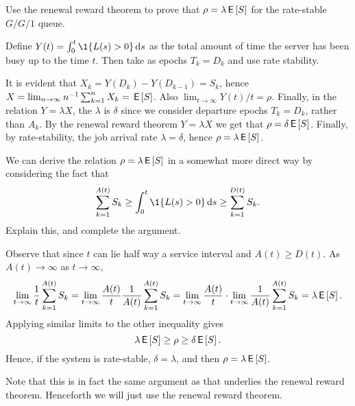 \begin{exercise}
Use the renewal reward theorem to prove that $\rho = \lambda \,\mathsf{E}\left[S\right]$ for the rate-stable $G/G/1$ queue. 
\begin{hint}
 Define $Y(t) = \int_0^t \1{L(s)>0} \d s$ as the total amount of time the server has been busy up to the time $t$.
 Then take as epochs $T_k = D_k$ and use rate stability.
\end{hint}
\begin{solution}
 It is evident that $X_k = Y(D_k)-Y(D_{k-1})=S_k$, hence $X = \lim_{n\to\infty} n^{-1}\sum_{k=1}^n X_k = \,\mathsf{E}\left[S\right]$.
 Also $\lim_{t\to\infty} Y(t)/t=\rho$.
 Finally, in the relation $Y = \lambda X$, the $\lambda$ is $\delta$ since we consider departure epochs $T_k = D_k$, rather than $A_k$.
 By the renewal reward theorem $Y=\lambda X$ we get that $\rho = \delta \,\mathsf{E}\left[S\right]$.
 Finally, by rate-stability, the job arrival rate $\lambda = \delta$, hence $\rho = \lambda \,\mathsf{E}\left[S\right]$.
\end{solution}
\end{exercise}


\begin{exercise}
 We can derive the relation $\rho = \lambda \,\mathsf{E}\left[S\right]$ in a somewhat more direct way by considering the fact that
\begin{equation*}
 \sum_{k=1}^{A(t)} S_k \geq \int_0^t \1{L(s)>0} \d s \geq \sum_{k=1}^{D(t)} S_k.
\end{equation*}
Explain this, and complete the argument.
\begin{solution}
Observe that
since $t$ can lie half way a service interval and $A(t) \geq D(t)$. As
$A(t)\to \infty$ as $t\to\infty$,
\begin{equation*}
 \lim_{t\to\infty} \frac 1 t\sum_{k=1}^{A(t)} S_k = 
 \lim_{t\to\infty} \frac{A(t)}t \frac{1}{A(t)} \sum_{k=1}^{A(t)} S_k = 
 \lim_{t\to\infty} \frac{A(t)}t \cdot \lim_{t\to\infty}\frac{1}{A(t)} \sum_{k=1}^{A(t)} S_k = \lambda \,\mathsf{E}\left[S\right].
\end{equation*}
Applying similar limits to the other inequality gives
\begin{equation*}
\lambda \,\mathsf{E}\left[S\right] \geq \rho \geq \delta \,\mathsf{E}\left[S\right].
\end{equation*}
Hence, if the system is rate-stable, $\delta=\lambda$, and then $\rho = \lambda \,\mathsf{E}\left[S\right]$. 

Note that this is in fact the same argument as that underlies the renewal reward theorem. Henceforth we will just use the renewal reward theorem. 
\end{solution}
\end{exercise}





